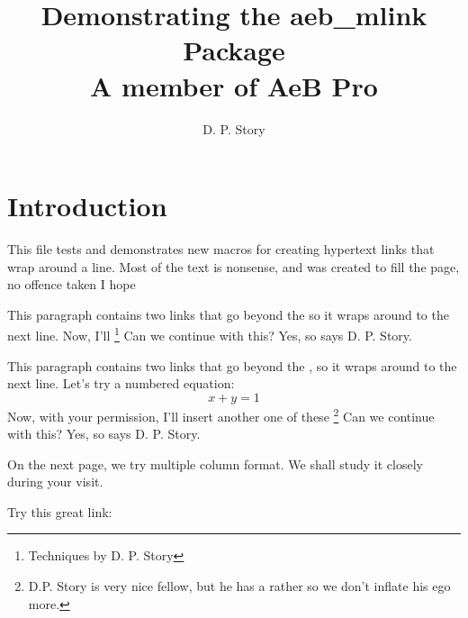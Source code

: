 \documentclass{article}
\title{Demonstrating the \textsf{aeb\_mlink} Package\texorpdfstring{\\[3pt]}{: }A member of AeB Pro}
\author{D. P. Story}
\begin{document}
\maketitle

\section{Introduction}


This file tests and demonstrates new macros for creating hypertext
links that wrap around a line. Most of the text is nonsense, and was
created to fill the page, no offence taken I hope

This paragraph contains two links that go beyond the
 so it wraps around to the
next line. Now, I'll \footnote{Techniques by D. P.
Story} Can we continue with this? Yes, so says D. P. Story.

This paragraph contains two links that go beyond the
,
so it wraps around to the next line. Let's try a numbered equation:
\begin{equation}
                \boxed{x + y = 1}
\end{equation}
Now, with your permission, I'll insert another one of these
\footnote{D.P. Story is very nice fellow, but he has a rather
 so we don't inflate his ego more.} Can we continue with
this? Yes, so says D. P. Story.


On the next page, we try multiple column format.
We shall study it closely during your visit.

Try this great link: 


\parskip0pt
\end{document}
